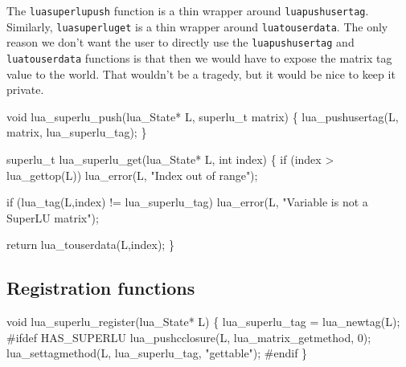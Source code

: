 The {\tt{}lua{}superlu{}push} function is a thin wrapper around
{\tt{}lua{}pushusertag}.  Similarly, {\tt{}lua{}superlu{}get} is a
thin wrapper around {\tt{}lua{}touserdata}.  The only reason we
don't want the user to directly use the {\tt{}lua{}pushusertag} and 
{\tt{}lua{}touserdata} functions is that then we would have
to expose the matrix tag value to the world.  That wouldn't
be a tragedy, but it would be nice to keep it private.

\nwenddocs{}\endmoddef
void lua_superlu_push(lua_State* L, superlu_t matrix)
\{
    lua_pushusertag(L, matrix, lua_superlu_tag);
\}

superlu_t lua_superlu_get(lua_State* L, int index)
\{
    if (index > lua_gettop(L))
        lua_error(L, "Index out of range");

    if (lua_tag(L,index) != lua_superlu_tag)
        lua_error(L, "Variable is not a SuperLU matrix");

    return lua_touserdata(L,index);
\}

\nwendcode{}\nwdocspar


\subsection{Registration functions}

\nwenddocs{}\plusendmoddef
void lua_superlu_register(lua_State* L)
\{
    lua_superlu_tag = lua_newtag(L);
#ifdef HAS_SUPERLU
    lua_pushcclosure(L, lua_matrix_getmethod, 0);
    lua_settagmethod(L, lua_superlu_tag, "gettable");
#endif
\}

\nwendcode{}

%
%
%
%
%
\nwdocspar
\nwenddocs{}
